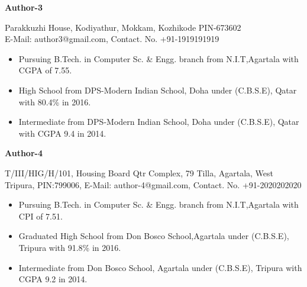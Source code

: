 \documentclass[USenglish,a4paper,12pt]{nitathesis}
\numberwithin{figure}{chapter}
\begin{document}
\begin{center}
{\textbf{\large Author-3}}\end{center} %
\begin{center}
Parakkuzhi House, Kodiyathur, Mokkam, Kozhikode  PIN-673602 \\E-Mail: author3@gmail.com,  Contact. No. +91-1919191919 \\
 \end{center}
 \begin{itemize}
 \setlength\itemsep{0pt}
\item Pursuing B.Tech. in Computer Sc. \& Engg. branch from N.I.T,Agartala with CGPA of 7.55.
\item High School from DPS-Modern Indian School, Doha under (C.B.S.E), Qatar with 80.4\% in 2016.
\item Intermediate from DPS-Modern Indian School, Doha under (C.B.S.E), Qatar with CGPA 9.4 in 2014.
\end{itemize}

\begin{center}
{\textbf{\large Author-4}}\end{center} %
\begin{center}
T/III/HIG/H/101, Housing Board Qtr Complex, 79 Tilla, Agartala, West Tripura, PIN:799006,  E-Mail: author-4@gmail.com,  Contact. No. +91-2020202020 \\
 \end{center}
 \begin{itemize}
 \setlength\itemsep{0pt}
\item Pursuing B.Tech. in Computer Sc. \& Engg. branch from N.I.T,Agartala with CPI of 7.51.
\item Graduated High School from Don Bosco School,Agartala under (C.B.S.E), Tripura with 91.8\% in 2016.
\item Intermediate from Don Bosco School, Agartala under (C.B.S.E), Tripura with CGPA 9.2 in 2014.
\end{itemize}
\end{document}
